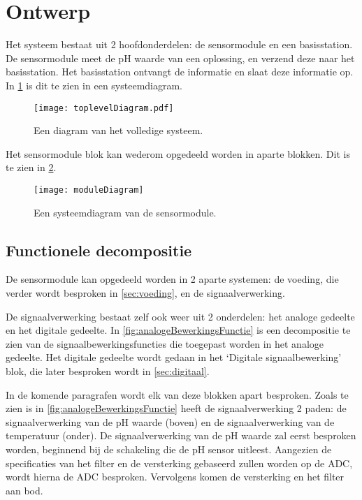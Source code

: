 \section{Ontwerp}\label{sec:ontwerp}
Het systeem bestaat uit 2 hoofdonderdelen: de sensormodule en een basisstation. De sensormodule meet de pH waarde van een oplossing, en verzend deze naar het basisstation. Het basisstation ontvangt de informatie en slaat deze informatie op.
In \cref{fig:functional} is dit te zien in een systeemdiagram.

\begin{figure}[!htbp]
    \centering
    \texttt{[image: toplevelDiagram.pdf]}
    \caption[short]{Een diagram van het volledige systeem.}
    \label{fig:functional}
\end{figure}

Het sensormodule blok kan wederom opgedeeld worden in aparte blokken. Dit is te zien in \cref{fig:moduleDiagram}.

\begin{figure}[!htbp]
    \centering
    \texttt{[image: moduleDiagram]}
    \caption{Een systeemdiagram van de sensormodule.}
    \label{fig:moduleDiagram}
\end{figure}

\subsection{Functionele decompositie}
De sensormodule kan opgedeeld worden in 2 aparte systemen: de voeding, die verder wordt besproken in \cref{sec:voeding}, en de signaalverwerking.

De signaalverwerking bestaat zelf ook weer uit 2 onderdelen: het analoge gedeelte en het digitale gedeelte. In \cref{fig:analogeBewerkingsFunctie} is een decompositie te zien van de signaalbewerkingsfuncties die toegepast worden in het analoge gedeelte. Het digitale gedeelte wordt gedaan in het `Digitale signaalbewerking' blok, die later besproken wordt in \cref{sec:digitaal}.

In de komende paragrafen wordt elk van deze blokken apart besproken. Zoals te zien is in \cref{fig:analogeBewerkingsFunctie} heeft de signaalverwerking 2 paden: de signaalverwerking van de pH waarde (boven) en de signaalverwerking van de temperatuur (onder). De signaalverwerking van de pH waarde zal eerst besproken worden, beginnend bij de schakeling die de pH sensor uitleest. Aangezien de specificaties van het filter en de versterking gebaseerd zullen worden op de ADC, wordt hierna de ADC besproken. Vervolgens komen de versterking en het filter aan bod.

